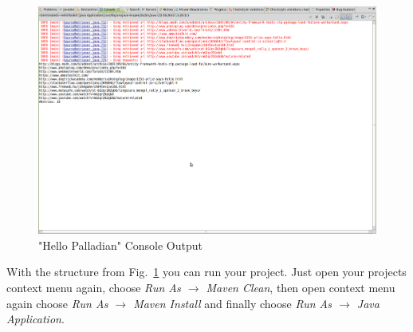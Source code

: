 \begin{figure}
\centering
\includegraphics[trim=0 550px 100px 0,clip=true,width=\textwidth]{img/ht14.png}
\caption{"Hello Palladian" Console Output}
\label{fig:structure}
\end{figure}
With the structure from Fig.~\ref{fig:structure} you can run your project. Just open your projects context menu again, choose \textit{Run As $\rightarrow$ Maven Clean}, then open context menu again choose \textit{Run As $\rightarrow$ Maven Install} and finally choose \textit{Run As $\rightarrow$ Java Application}.


%
%
%



